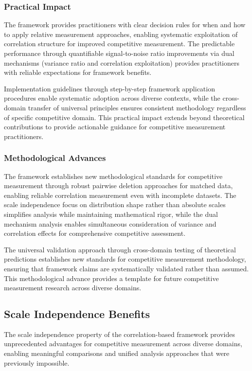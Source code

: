 \subsubsection{Practical Impact}

The framework provides practitioners with clear decision rules for when and how to apply relative measurement approaches, enabling systematic exploitation of correlation structure for improved competitive measurement. The predictable performance through quantifiable signal-to-noise ratio improvements via dual mechanisms (variance ratio and correlation exploitation) provides practitioners with reliable expectations for framework benefits.

Implementation guidelines through step-by-step framework application procedures enable systematic adoption across diverse contexts, while the cross-domain transfer of universal principles ensures consistent methodology regardless of specific competitive domain. This practical impact extends beyond theoretical contributions to provide actionable guidance for competitive measurement practitioners.

\subsubsection{Methodological Advances}

The framework establishes new methodological standards for competitive measurement through robust pairwise deletion approaches for matched data, enabling reliable correlation measurement even with incomplete datasets. The scale independence focus on distribution shape rather than absolute scales simplifies analysis while maintaining mathematical rigor, while the dual mechanism analysis enables simultaneous consideration of variance and correlation effects for comprehensive competitive assessment.

The universal validation approach through cross-domain testing of theoretical predictions establishes new standards for competitive measurement methodology, ensuring that framework claims are systematically validated rather than assumed. This methodological advance provides a template for future competitive measurement research across diverse domains.

\subsection{Scale Independence Benefits}

The scale independence property of the correlation-based framework provides unprecedented advantages for competitive measurement across diverse domains, enabling meaningful comparisons and unified analysis approaches that were previously impossible.

